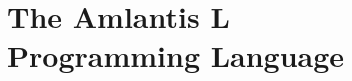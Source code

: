 
\part[The Amlantis S Programming Language]{The Amlantis L \\Programming Language \\ \vspace{1cm} }
\label{part:language-s}
















